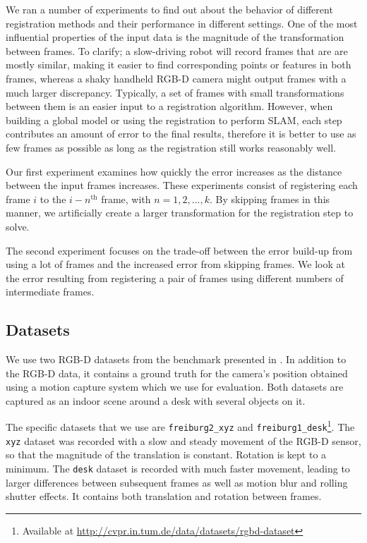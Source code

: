 \documentclass[a4paper]{article}
\begin{document}
We ran a number of experiments to find out about the behavior of different registration methods and their performance in different settings. One of the most influential properties of the input data is the magnitude of the transformation between frames. To clarify; a slow-driving robot will record frames that are are mostly similar, making it easier to find corresponding points or features in both frames, whereas a shaky handheld RGB-D camera might output frames with a much larger discrepancy. Typically, a set of frames with small transformations between them is an easier input to a registration algorithm. However, when building a global model or using the registration to perform SLAM, each step contributes an amount of error to the final results, therefore it is better to use as few frames as possible as long as the registration still works reasonably well.

Our first experiment examines how quickly the error increases as the distance between the input frames increases. These experiments consist of registering each frame $i$ to the $i-n^{\mathrm{th}}$ frame, with $n = {1,2,...,k}$. By skipping frames in this manner, we artificially create a larger transformation for the registration step to solve. 

The second experiment focuses on the trade-off between the error build-up from using a lot of frames and the increased error from skipping frames. We look at the error resulting from registering a pair of frames using different numbers of intermediate frames.

\subsection{Datasets}

We use two RGB-D datasets from the benchmark presented in \cite{sturm11rss-rgbd}. In addition to the RGB-D data, it contains a ground truth for the camera's position obtained using a motion capture system which we use for evaluation. Both datasets are captured as an indoor scene around a desk with several objects on it.

The specific datasets that we use are \texttt{freiburg2\_xyz} and \texttt{freiburg1\_desk}\footnote{Available at \url{http://cvpr.in.tum.de/data/datasets/rgbd-dataset}}. The \texttt{xyz} dataset was recorded with a slow and steady movement of the RGB-D sensor, so that the magnitude of the translation is constant. Rotation is kept to a minimum. The \texttt{desk} dataset is recorded with much faster movement, leading to larger differences between subsequent frames as well as motion blur and rolling shutter effects. It contains both translation and rotation between frames.
\end{document}
